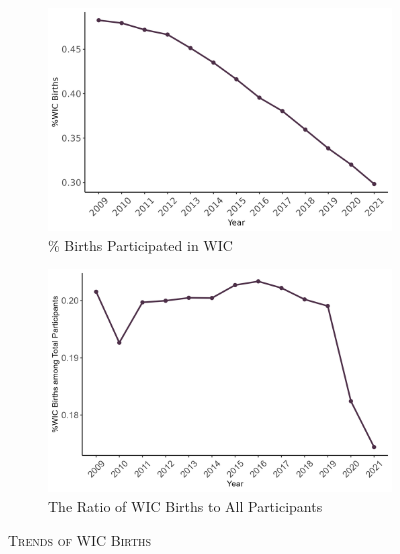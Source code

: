 \begin{figure}
	\begin{subfigure}[t]{.5\textwidth}
		\centering
		\includegraphics[width=\textwidth]{wic_par_sum_res.png}  
		\caption{\% Births Participated in WIC}
		\label{trend1}
	\end{subfigure}
	\begin{subfigure}[t]{.5\textwidth}
		\centering
		\includegraphics[width=\textwidth]{wic_par_pc.png}  
		\caption{The Ratio of WIC Births to All Participants}
		\label{trend2}
	\end{subfigure}
	\caption{\textsc{Trends of WIC Births}}
	\label{trend}
	\footnotesize
\end{figure} 

